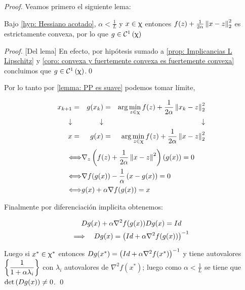 \begin{proof}
	Veamos primero el siguiente lema:
	
	\begin{lemma}
		\label{lemma: PP es suave}
		Bajo \ref{hyp: Hessiano acotado}, $\alpha < \frac{1}{L}$ y $x \in \upchi$ entonces $f(z) + \frac{1}{2 \alpha} \left\lVert x- z\right\rVert_2^2$ es estrictamente convexa, por lo que $g \in \mathcal{C}^1 \left(\upchi\right)$
	\end{lemma}

	\begin{proof}{[Del lema]}
		En efecto, por hip\'otesis sumado a \ref{prop: Implicancias L Lipschitz} y \ref{coro: convexa y fuertemente convexa es fuertemente convexa} concluimos que $g \in \mathcal{C}^1 \left(\upchi\right)$.\qed
	\end{proof}
	
	Por lo tanto por \ref{lemma: PP es suave} podemos tomar l\'imite, \ie
	
	\begin{equation*}
	\begin{aligned}
	x_{k+1} & = & g(x_k) & = & \arg \min\limits_{z \in \upchi}{f(z) + \dfrac{1}{2\alpha}\left\lVert x_k - z\right\rVert_{2}^{2}} \\
	\downarrow & & \downarrow & & \downarrow \\
	x & = & g(x) & = & \arg \min\limits_{z \in \upchi}{f(z) + \dfrac{1}{2\alpha}\left\lVert x - z\right\rVert_{2}^{2}}
	\end{aligned}
	\end{equation*}
	\begin{equation*}
	\begin{aligned}
	\Longleftrightarrow & \nabla_z \left(f(z) + \frac{1}{2 \alpha} \left\lVert x-z\right\rVert^2\right)(g(x)) = 0 \\
	\Longleftrightarrow & \nabla f(g(x)) - \frac{1}{\alpha} \left(x-g(x)\right) = 0 \\
	\Longleftrightarrow & g(x) + \alpha \nabla f(g(x)) = x
	\end{aligned}
	\end{equation*}
	
	Finalmente por diferenciaci\'on implicita obtenemos:
	
	\begin{gather*}
		Dg(x) + \alpha\nabla^2 f (g(x))Dg(x) = Id \\
		\Longrightarrow \quad Dg(x) = \left(Id + \alpha \nabla^2 f(g(x))\right)^{-1}
	\end{gather*}

	Luego si $x^* \in \upchi^*$ entonces $Dg(x^*) = \left(Id + \alpha \nabla^2 f(x^*)\right)^{-1}$ y tiene autovalores $\left\lbrace\dfrac{1}{1+ \alpha \lambda_i}\right\rbrace$ con $\lambda_i$ autovalores de $\nabla^2 f(x^*)$; luego como $\alpha < \frac{1}{L}$ se tiene que $\det \left(Dg(x)\right) \neq 0$. \qed
	
\end{proof}

